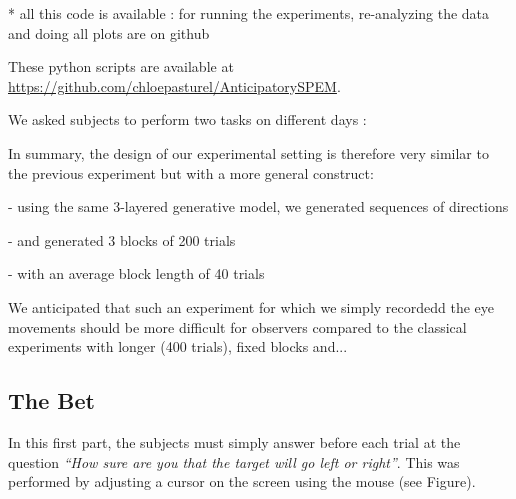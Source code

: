 \documentclass[profile,final,english, draft]{article}%
\begin{document}
  * all this code is available : for running the experiments, re-analyzing the data and doing all plots are on github

These python scripts are available at \url{https://github.com/chloepasturel/AnticipatorySPEM}.


We asked subjects to perform two tasks on different days :

In summary, the design of our experimental setting is therefore very similar to the previous experiment but with a more general construct:

- using the same 3-layered generative model, we generated sequences of directions

- and generated 3 blocks of 200 trials

- with an average block length of 40 trials

We anticipated that such an  experiment for which we simply recordedd the eye movements should be more difficult for observers compared to the classical experiments with longer (400 trials), fixed blocks and...

\subsection{The Bet}
In this first part, the subjects must simply answer before each trial at the question \textit{ ``How sure are you that the target will go left or right''}. This was performed by adjusting a cursor on the screen using the mouse (see Figure).

\end{document}
